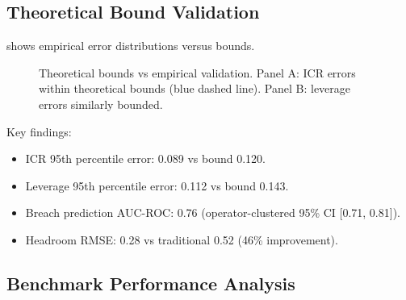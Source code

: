 \documentclass[11pt,a4paper]{article}
\numberwithin{equation}{section}
\theoremstyle{plain}
\theoremstyle{definition}
\begin{document}
\subsection{Theoretical Bound Validation}

 shows empirical error distributions versus bounds.

\begin{figure}[h]
\centering
{}
\caption{Theoretical bounds vs empirical validation. Panel A: ICR errors within theoretical bounds (blue dashed line). Panel B: leverage errors similarly bounded.}
\label{fig:theoretical_bounds}
\end{figure}

Key findings:
\begin{itemize}
\item ICR 95th percentile error: 0.089 vs bound 0.120.
\item Leverage 95th percentile error: 0.112 vs bound 0.143.
\item Breach prediction AUC-ROC: 0.76 (operator-clustered 95\% CI [0.71, 0.81]).
\item Headroom RMSE: 0.28 vs traditional 0.52 (46\% improvement).
\end{itemize}

\subsection{Benchmark Performance Analysis}
\end{document}
